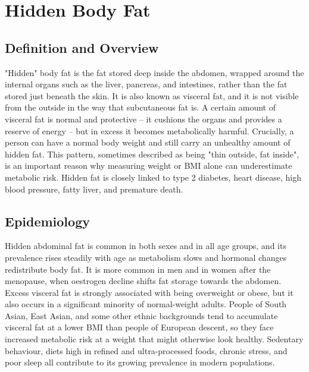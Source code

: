 \chapter{Hidden Body Fat}

\section*{Definition and Overview}
"Hidden" body fat is the fat stored deep inside the abdomen, wrapped around the internal organs such as the liver, pancreas, and intestines, rather than the fat stored just beneath the skin. It is also known as visceral fat, and it is not visible from the outside in the way that subcutaneous fat is. A certain amount of visceral fat is normal and protective -- it cushions the organs and provides a reserve of energy -- but in excess it becomes metabolically harmful. Crucially, a person can have a normal body weight and still carry an unhealthy amount of hidden fat. This pattern, sometimes described as being "thin outside, fat inside", is an important reason why measuring weight or BMI alone can underestimate metabolic risk. Hidden fat is closely linked to type 2 diabetes, heart disease, high blood pressure, fatty liver, and premature death.

\section*{Epidemiology}
Hidden abdominal fat is common in both sexes and in all age groups, and its prevalence rises steadily with age as metabolism slows and hormonal changes redistribute body fat. It is more common in men and in women after the menopause, when oestrogen decline shifts fat storage towards the abdomen. Excess visceral fat is strongly associated with being overweight or obese, but it also occurs in a significant minority of normal-weight adults. People of South Asian, East Asian, and some other ethnic backgrounds tend to accumulate visceral fat at a lower BMI than people of European descent, so they face increased metabolic risk at a weight that might otherwise look healthy. Sedentary behaviour, diets high in refined and ultra-processed foods, chronic stress, and poor sleep all contribute to its growing prevalence in modern populations.

